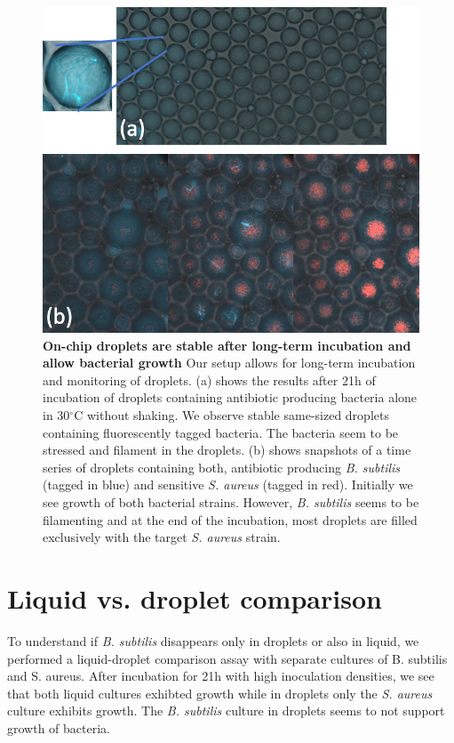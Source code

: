 \begin{figure}
\centering
\includegraphics[width=\linewidth]{graphics/2025_09_28_droplets_fig5.png}
\caption{\textbf{On-chip droplets are stable after long-term incubation and allow bacterial growth} Our setup allows for long-term incubation and monitoring of droplets. (a) shows the results after 21h of incubation of droplets containing antibiotic producing bacteria alone in 30$^\circ$C without shaking. We observe stable same-sized droplets containing fluorescently tagged bacteria. The bacteria seem to be stressed and filament in the droplets. (b) shows snapshots of a time series of droplets containing both, antibiotic producing \textit{B. subtilis} (tagged in blue) and sensitive \textit{S. aureus} (tagged in red). Initially we see growth of both bacterial strains. However, \textit{B. subtilis} seems to be filamenting and at the end of the incubation, most droplets are filled exclusively with the target \textit{S. aureus} strain.}
\label{fig:results_incubation_subtilis}
\end{figure}

\section{Liquid vs. droplet comparison}
To understand if \textit{B. subtilis} disappears only in droplets or also in liquid, we performed a liquid-droplet comparison assay with separate cultures of B. subtilis and S. aureus. After incubation for 21h with high inoculation densities, we see that both liquid cultures exhibted growth while in droplets only the \textit{S. aureus} culture exhibits growth. The \textit{B. subtilis} culture in droplets seems to not support growth of bacteria.

